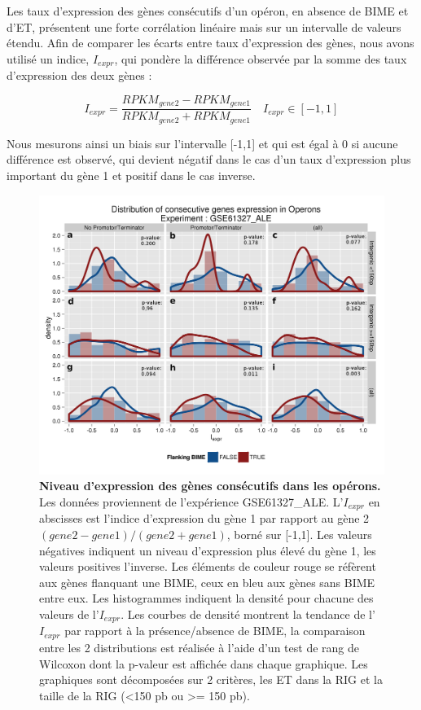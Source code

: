 \documentclass[12pt,a4paper]{report}
\begin{document}
\begin{onehalfspace}
Les taux d'expression des gènes consécutifs d'un opéron, en absence de BIME et d'ET, présentent une forte corrélation linéaire mais sur un intervalle de valeurs étendu. Afin de comparer les écarts entre taux d'expression des gènes, nous avons utilisé un indice, $I_{expr}$, qui pondère la différence observée par la somme des taux d'expression des deux gènes :

\[ I_{expr} = \frac{RPKM_{gene2} - RPKM_{gene1}}{RPKM_{gene2} + RPKM_{gene1}} \quad I_{expr} \in [-1,1]\]

Nous mesurons ainsi un biais sur l'intervalle [-1,1] et qui est égal à 0 si aucune différence est observé, qui devient négatif dans le cas d'un taux d'expression plus important du gène 1 et positif dans le cas inverse.

\begin{figure}[h!]
\centerline{\includegraphics[scale=0.82]{figures/genesOperon_histoDens_GSE61327_ALE.png}}
\caption{\textbf{Niveau d'expression des gènes consécutifs dans les opérons.} Les données proviennent de l'expérience GSE61327\_ALE. L'$I_{expr}$ en abscisses est l'indice d'expression du gène 1 par rapport au gène 2 $(gene2 - gene1) / (gene2 + gene1)$, borné sur [-1,1]. Les valeurs négatives indiquent un niveau d'expression plus élevé du gène 1, les valeurs positives l'inverse. Les éléments de couleur rouge se réfèrent aux gènes flanquant une BIME, ceux en bleu aux gènes sans BIME entre eux. Les histogrammes indiquent la densité pour chacune des valeurs de l'$I_{expr}$. Les courbes de densité montrent la tendance de l'$I_{expr}$ par rapport à la présence/absence de BIME, la comparaison entre les 2 distributions est réalisée à l'aide d'un test de rang de Wilcoxon dont la p-valeur est affichée dans chaque graphique. Les graphiques sont décomposées sur 2 critères, les ET dans la RIG et la taille de la RIG (<150 pb ou >= 150 pb).}
\label{fig:expression_operon}
\end{figure}


\end{onehalfspace}
\end{document}
